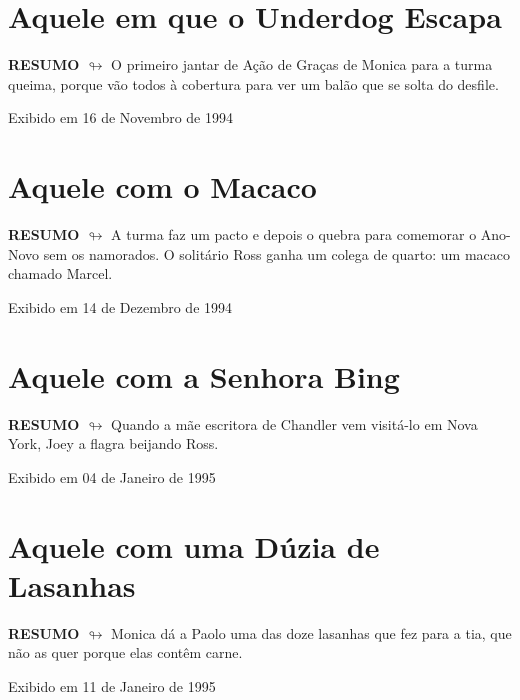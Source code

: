 \chapter{Aquele em que o Underdog Escapa}

\textbf{RESUMO $\looparrowright$} O primeiro jantar de Ação de Graças de Monica para a turma queima, porque vão todos à cobertura para ver um balão que se solta do desfile.

\begin{flushright}
\textcolor{gray600}{Exibido em 16 de Novembro de 1994}
\end{flushright}


\chapter{Aquele com o Macaco}

\textbf{RESUMO $\looparrowright$} A turma faz um pacto e depois o quebra para comemorar o Ano-Novo sem os namorados. O solitário Ross ganha um colega de quarto: um macaco chamado Marcel.

\begin{flushright}
\textcolor{gray600}{Exibido em 14 de Dezembro de 1994}
\end{flushright}


\chapter{Aquele com a Senhora Bing}

\textbf{RESUMO $\looparrowright$} Quando a mãe escritora de Chandler vem visitá-lo em Nova York, Joey a flagra beijando Ross.

\begin{flushright}
\textcolor{gray600}{Exibido em 04 de Janeiro de 1995}
\end{flushright}


\chapter{Aquele com uma Dúzia de Lasanhas}

\textbf{RESUMO $\looparrowright$} Monica dá a Paolo uma das doze lasanhas que fez para a tia, que não as quer porque elas contêm carne.

\begin{flushright}
\textcolor{gray600}{Exibido em 11 de Janeiro de 1995}
\end{flushright}


